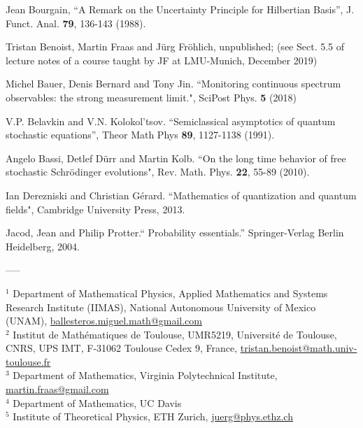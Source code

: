 \documentclass[11pt]{article}
\begin{document}
\begin{thebibliography}{References}
 Jean Bourgain, ``A Remark on the Uncertainty Principle for Hilbertian Basis'', J. Funct. Anal. {\bf{79}}, 136-143 (1988).

 Tristan Benoist, Martin Fraas and J\"urg Fr\"ohlich, unpublished; (see Sect. 5.5 of lecture notes of a course taught by JF at LMU-Munich, December 2019)

 Michel Bauer, Denis Bernard and Tony Jin. ``Monitoring continuous spectrum observables: the strong measurement limit.", SciPost Phys. {\bf{5}} (2018)

  V.P. Belavkin and V.N. Kolokol'tsov. ``Semiclassical asymptotics of quantum stochastic equations'', Theor Math Phys {\bf{89}}, 1127-1138 (1991).

 Angelo Bassi, Detlef D\"{u}rr and Martin Kolb. ``On the long time behavior of free stochastic Schr\"{o}dinger evolutions", Rev. Math. Phys. {\bf{22}}, 55-89 (2010).

 Ian Derezniski and Christian G\'erard. ``Mathematics of quantization and quantum fields", Cambridge University Press, 2013.

 Jacod, Jean and Philip Protter.`` Probability essentials.'' Springer-Verlag Berlin Heidelberg, 2004.
\end{thebibliography}

\begin{center}
-----
\end{center}


\bigskip


\noindent
$^{1}$ Department of Mathematical Physics, Applied Mathematics and Systems Research Institute (IIMAS),
National Autonomous University of Mexico (UNAM), \href{mailto:ballesteros.miguel.math@gmail.com}{ballesteros.miguel.math@gmail.com}
\\[0.3em]
$^{2}$ Institut de Mathématiques de Toulouse, UMR5219, Université de Toulouse, CNRS, UPS IMT, F-31062 Toulouse Cedex 9, France, \href{mailto:tristan.benoist@math.univ-toulouse.fr}{tristan.benoist@math.univ-toulouse.fr}
\\[0.3em]
$^{3}$ Department of Mathematics, Virginia Polytechnical Institute, \href{mailto:martin.fraas@gmail.com}{martin.fraas@gmail.com}
\\[0.3em]
$^{4}$ Department of Mathematics, UC Davis
\\[0.3em]
$^{5}$ Institute of Theoretical Physics, ETH Zurich, \href{mailto:juerg@phys.ethz.ch}{juerg@phys.ethz.ch}
\end{document}
